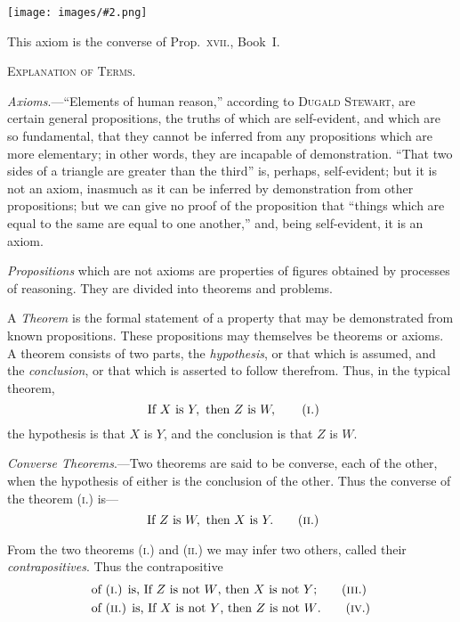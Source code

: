 \documentclass[oneside]{book}
\newcommand\imgcent[2]{
\begin{center}
\texttt{[image: images/\#2.png]}
\end{center}
}
\begin{document}
\imgcent{132}{f011}

This axiom is the converse of Prop.~\textsc{xvii}., Book~I.


\begin{center}
\textsc{Explanation of Terms.}
\end{center}

\emph{Axioms}.---``Elements of human reason,'' according to
\textsc{Dugald Stewart}, are certain general propositions, the
truths of which are self-evident, and which are so fundamental,
that they cannot be inferred from any propositions
which are more elementary; in other words,
they are incapable of demonstration. ``That two sides
of a triangle are greater than the third'' is, perhaps,
self-evident; but it is not an axiom, inasmuch as it can
be inferred by demonstration from other propositions;
but we can give no proof of the proposition that
``things which are equal to the same are equal to one
another,'' and, being self-evident, it is an axiom.

\emph{Propositions} which are not axioms are properties of
figures obtained by processes of reasoning. They are
divided into theorems and problems.

A \emph{Theorem} is the formal statement of a property that
may be demonstrated from known propositions. These
propositions may themselves be theorems or axioms. A
theorem consists of two parts, the \emph{hypothesis}, or that
which is assumed, and the \emph{conclusion}, or that which is
asserted to follow therefrom. Thus, in the typical
theorem,
\[
  \text{\ If } X \text{\ is } Y,\text{\ then }Z \text{\ is } W,
\tag{\textsc{i.}}
\]
the hypothesis is that $X$ is $Y$, and the conclusion is
that $Z$ is $W$.

\emph{Converse Theorems}.---Two theorems are said to be
converse, each of the other, when the hypothesis of
either is the conclusion of the other. Thus the converse
of the theorem (\textsc{i}.) is---
\[
  \text{\ If } Z \text{\ is } W, \text{\ then } X \text{\ is } Y.
\tag{\textsc{ii}.}
\]

From the two theorems (\textsc{i.}) and (\textsc{ii.}) we may infer
two others, called their \emph{contrapositives}. Thus the contrapositive
\begin{align*}
&\text{of (\textsc{i}.) is, If $Z$ is not $W$, then $X$ is not $Y$;} \tag{\textsc{iii}.}
\\
&\text{of (\textsc{ii}.) is, If $X$ is not $Y$, then $Z$ is not $W$.} \tag{\textsc{iv}.}
\end{align*}
\end{document}
